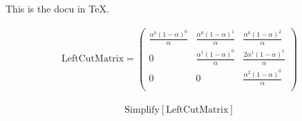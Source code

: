\documentclass{article}
\begin{document}
This is the docu in \TeX.

\begin{align*}
\text{LeftCutMatrix}=\left(
\begin{array}{ccc}
 \frac{\alpha ^0 (1-\alpha )^0}{\alpha } & \frac{\alpha ^0 (1-\alpha )^1}{\alpha } & \frac{\alpha ^0 (1-\alpha )^2}{\alpha } \\
 0 & \frac{\alpha ^1 (1-\alpha )^0}{\alpha } & \frac{2 \alpha ^1 (1-\alpha )^1}{\alpha } \\
 0 & 0 & \frac{\alpha ^2 (1-\alpha )^0}{\alpha } \\
\end{array}
\right)
\end{align*}

\begin{align*}
\text{Simplify}[\text{LeftCutMatrix}]
\end{align*}
\end{document}
